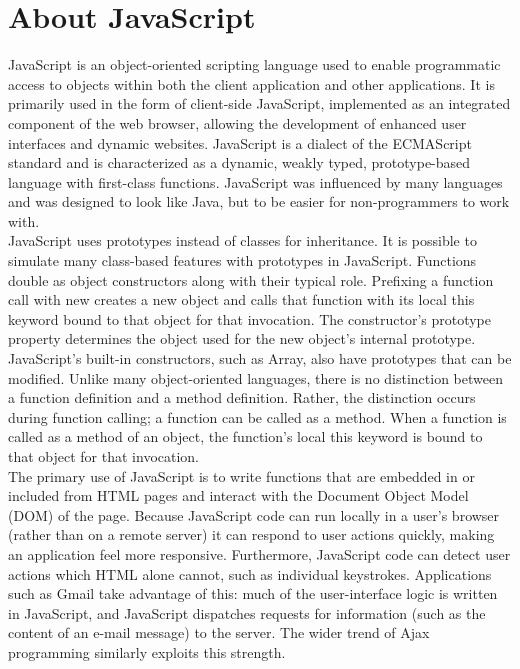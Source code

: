 \documentclass[12pt,a4 paper]{report}
\begin{document}
\section{About JavaScript}
JavaScript is an object-oriented scripting language used to enable programmatic access to objects within both the client application and other applications. It is primarily used in the form of client-side JavaScript, implemented as an integrated component of the web browser, allowing the development of enhanced user interfaces and dynamic websites. JavaScript is a dialect of the ECMAScript standard and is characterized as a dynamic, weakly typed, prototype-based 
language with first-class functions. JavaScript was influenced by many languages and was designed to look like Java, but to be easier for non-programmers to work with.\\

JavaScript uses prototypes instead of classes for inheritance. It is possible to simulate many class-based features with prototypes in JavaScript. Functions double as object constructors along with their typical role. Prefixing a function call with new creates a new object and calls that function with its local this keyword bound to that object for that invocation. The constructor's prototype property determines the object used for the new object's internal prototype. \\

JavaScript's built-in constructors, such as Array, also have prototypes that can be modified. Unlike many object-oriented languages, there is no distinction between a function definition and a method definition. Rather, the distinction occurs during function calling; a function can be called as a method. When a function is called as a method of an object, the function's local this keyword is bound to that object for that invocation.\\

The primary use of JavaScript is to write functions that are embedded in or included from HTML pages and interact with the Document Object Model (DOM) of the page. Because JavaScript code can run locally in a user's browser (rather than on a 
remote server) it can respond to user actions quickly, making an application feel more responsive. Furthermore, JavaScript code can detect user actions which HTML alone cannot, such as individual keystrokes. Applications such as Gmail take advantage of this: much of the user-interface logic is written in JavaScript, and JavaScript dispatches requests for information (such as the content of an e-mail message) to the server. The wider trend of Ajax programming similarly 
exploits this strength. \\
\end{document}
